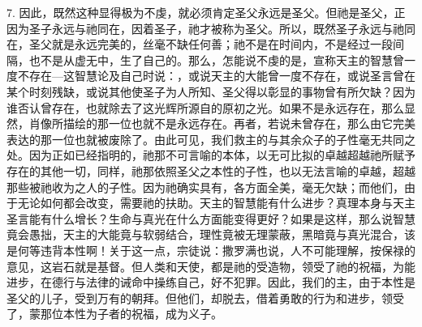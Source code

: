 7. 因此，既然这种显得极为不虔，就必须肯定圣父永远是圣父。但祂是圣父，正因为圣子永远与祂同在，因着圣子，祂才被称为圣父。所以，既然圣子永远与祂同在，圣父就是永远完美的，丝毫不缺任何善；祂不是在时间内，不是经过一段间隔，也不是从虚无中，生了自己的。那么，怎能说不虔的是，宣称天主的智慧曾一度不存在---这智慧论及自己时说：，或说天主的大能曾一度不存在，或说圣言曾在某个时刻残缺，或说其他使圣子为人所知、圣父得以彰显的事物曾有所欠缺？因为谁否认曾存在，也就除去了这光辉所源自的原初之光。如果不是永远存在，那么显然，肖像所描绘的那一位也就不是永远存在。再者，若说未曾存在，那么由它完美表达的那一位也就被废除了。由此可见，我们救主的与其余众子的子性毫无共同之处。因为正如已经指明的，祂那不可言喻的本体，以无可比拟的卓越超越祂所赋予存在的其他一切，同样，祂那依照圣父之本性的子性，也以无法言喻的卓越，超越那些被祂收为之人的子性。因为祂确实具有，各方面全美，毫无欠缺；而他们，由于无论如何都会改变，需要祂的扶助。天主的智慧能有什么进步？真理本身与天主圣言能有什么增长？生命与真光在什么方面能变得更好？如果是这样，那么说智慧竟会愚拙，天主的大能竟与软弱结合，理性竟被无理蒙蔽，黑暗竟与真光混合，该是何等违背本性啊！关于这一点，宗徒说：撒罗满也说，人不可能理解，按保禄的意见，这岩石就是基督。但人类和天使，都是祂的受造物，领受了祂的祝福，为能进步，在德行与法律的诫命中操练自己，好不犯罪。因此，我们的主，由于本性是圣父的儿子，受到万有的朝拜。但他们，却脱去，借着勇敢的行为和进步，领受了，蒙那位本性为子者的祝福，成为义子。\par

